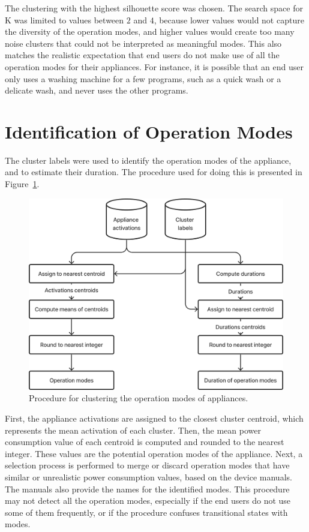 The clustering with the highest silhouette score was chosen. The search space for K was limited to values between $2$ and $4$, because lower values would not capture the diversity of the operation modes, and higher values would create too many noise clusters that could not be interpreted as meaningful modes. This also matches the realistic expectation that end users do not make use of all the operation modes for their appliances. For instance, it is possible that an end user only uses a washing machine for a few programs, such as a quick wash or a delicate wash, and never uses the other programs.

\section{Identification of Operation Modes}

The cluster labels were used to identify the operation modes of the appliance, and to estimate their duration. The procedure used for doing this is presented in Figure~\ref{fig:identification}.

\begin{figure}
  \centering
  \includegraphics[width=.55\linewidth]{images/modes_clustering/identification.png}
  \caption[Procedure for clustering the operation modes of appliances]{Procedure for clustering the operation modes of appliances.}
  \label{fig:identification}
\end{figure}

First, the appliance activations are assigned to the closest cluster centroid, which represents the mean activation of each cluster. Then, the mean power consumption value of each centroid is computed and rounded to the nearest integer. These values are the potential operation modes of the appliance. Next, a selection process is performed to merge or discard operation modes that have similar or unrealistic power consumption values, based on the device manuals. The manuals also provide the names for the identified modes. This procedure may not detect all the operation modes, especially if the end users do not use some of them frequently, or if the procedure confuses transitional states with modes.

